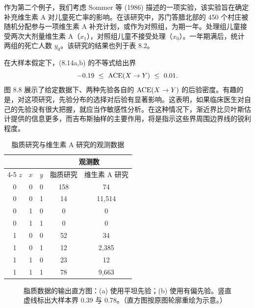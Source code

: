 作为第二个例子，我们考虑 Sommer 等 (1986) 描述的一项实验，该实验旨在确定补充维生素 A 对儿童死亡率的影响。在该研究中，苏门答腊北部的 450 个村庄被随机分配参与一项维生素 A 补充计划，或作为对照组，为期一年。处理组儿童接受两次大剂量维生素 A（$x_1$），对照组儿童不接受处理（$x_0$）。一年期满后，统计两组的死亡人数 $y_0$。该研究的结果也列于表 8.2。

在大样本假定下，\textup{(8.14a,b)} 的不等式给出界
\[
-0.19\ \le\ \ACE(X\to Y)\ \le\ 0.01.
\]
图 8.8 展示了给定数据下、两种先验各自的 $\mathrm{ACE}(X\to Y)$ 的后验密度。有趣的是，对这项研究，先验分布的选择对后验有显著影响。这表明，如果临床医生对自己的先验没有很大把握，就应当作敏感性分析。在这种情况下，渐近界比贝叶斯估计提供的信息更多，而吉布斯抽样的主要作用，将是指示这些界周围边界线的锐利程度。

\begin{table}[htbp]
\centering
\caption{脂质研究与维生素 A 研究的观测数据}
\label{tab:8.2}
\small
\begin{tabular}{ccccc}
\toprule
\multicolumn{3}{c}{} & \multicolumn{2}{c}{观测数} \\
\cmidrule(lr){4-5}
$z$ & $x$ & $y$ & 脂质研究 & 维生素 A 研究 \\
\midrule
0 & 0 & 0 & 158   & 74 \\
0 & 0 & 1 & 14    & 11{,}514 \\
0 & 1 & 0 & 0     & 0 \\
0 & 1 & 1 & 0     & 0 \\
1 & 0 & 0 & 52    & 34 \\
1 & 0 & 1 & 12    & 2{,}385 \\
1 & 1 & 0 & 23    & 12 \\
1 & 1 & 1 & 78    & 9{,}663 \\
\bottomrule
\end{tabular}
\end{table}

\begin{figure}[htbp]
\centering
{}
\caption{脂质数据的输出直方图：(a) 使用平坦先验；(b) 使用有偏先验。竖直虚线标出大样本界 0.39 与 0.78。（直方图按原图轮廓重绘为示意。）}
\label{fig:8.7}
\end{figure}

